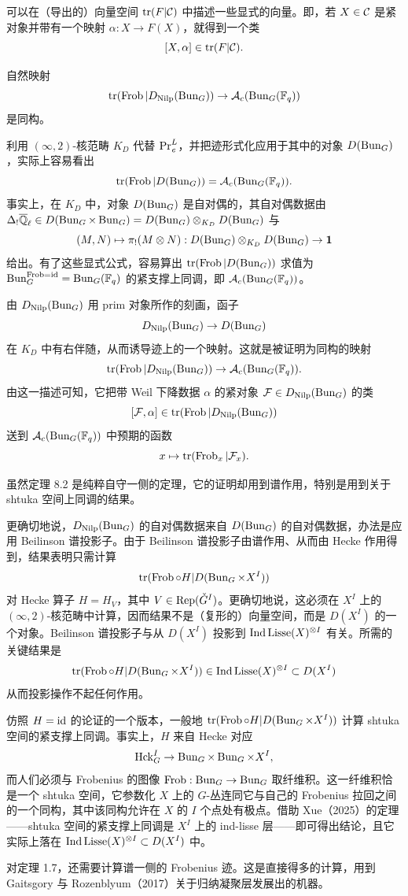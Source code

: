 可以在（导出的）向量空间 $\tr(F|\cC)$ 中描述一些显式的向量。即，若 $X\in\cC$ 是紧对象并带有一个映射 $\alpha:X\to F(X)$，就得到一个类
\[ [X,\alpha]\in\tr(F|\cC). \]

\begin{theorem}
自然映射
\[ \tr(\Frob|D_{\Nilp}(\Bun_G))\to\cA_c(\Bun_G(\Fq)) \]
是同构。
\end{theorem}

利用 $(\infty,2)$-核范畴 $K_D$ 代替 $\PrL_{\e}$，并把迹形式化应用于其中的对象 $D(\Bun_G)$，实际上容易看出
\[ \tr(\Frob|D(\Bun_G))=\cA_c(\Bun_G(\Fq)). \]
事实上，在 $K_D$ 中，对象 $D(\Bun_G)$ 是自对偶的，其自对偶数据由 $\Delta_{!}\Ql\in D(\Bun_G\times\Bun_G)=D(\Bun_G)\otimes_{K_D}D(\Bun_G)$ 与
\[ (M,N)\mapsto\pi_{!}(M\otimes N):D(\Bun_G)\otimes_{K_D}D(\Bun_G)\to\mathbf{1} \]
给出。有了这些显式公式，容易算出 $\tr(\Frob|D(\Bun_G))$ 求值为 $\Bun_G^{\Frob=\id}=\Bun_G(\Fq)$ 的紧支撑上同调，即 $\cA_c(\Bun_G(\Fq))$。

由 $D_{\Nilp}(\Bun_G)$ 用 prim 对象所作的刻画，函子
\[ D_{\Nilp}(\Bun_G)\to D(\Bun_G) \]
在 $K_D$ 中有右伴随，从而诱导迹上的一个映射。这就是被证明为同构的映射
\[ \tr(\Frob|D_{\Nilp}(\Bun_G))\to\cA_c(\Bun_G(\Fq)). \]
由这一描述可知，它把带 Weil 下降数据 $\alpha$ 的紧对象 $\cF\in D_{\Nilp}(\Bun_G)$ 的类
\[ [\cF,\alpha]\in\tr(\Frob|D_{\Nilp}(\Bun_G)) \]
送到 $\cA_c(\Bun_G(\Fq))$ 中预期的函数
\[ x\mapsto\tr(\Frob_x|\cF_x). \]

虽然定理 8.2 是纯粹自守一侧的定理，它的证明却用到谱作用，特别是用到关于 shtuka 空间上同调的结果。

更确切地说，$D_{\Nilp}(\Bun_G)$ 的自对偶数据来自 $D(\Bun_G)$ 的自对偶数据，办法是应用 Beilinson 谱投影子。由于 Beilinson 谱投影子由谱作用、从而由 Hecke 作用得到，结果表明只需计算
\[ \tr(\Frob\circ H|D(\Bun_G\times X^{I})) \]
对 Hecke 算子 $H=H_V$，其中 $V\in\Rep(\Gd^{I})$。更确切地说，这必须在 $X^{I}$ 上的 $(\infty,2)$-核范畴中计算，因而结果不是（复形的）向量空间，而是 $D(X^{I})$ 的一个对象。Beilinson 谱投影子与从 $D(X^{I})$ 投影到 $\Ind\Lisse(X)^{\otimes I}$ 有关。所需的关键结果是
\[ \tr(\Frob\circ H|D(\Bun_G\times X^{I}))\in\Ind\Lisse(X)^{\otimes I}\subset D(X^{I}) \]
从而投影操作不起任何作用。

仿照 $H=\id$ 的论证的一个版本，一般地 $\tr(\Frob\circ H|D(\Bun_G\times X^{I}))$ 计算 shtuka 空间的紧支撑上同调。事实上，$H$ 来自 Hecke 对应
\[ \Hck^{I}_{G}\to\Bun_G\times\Bun_G\times X^{I}, \]
而人们必须与 Frobenius 的图像 $\Frob:\Bun_G\to\Bun_G$ 取纤维积。这一纤维积恰是一个 shtuka 空间，它参数化 $X$ 上的 $G$-丛连同它与自己的 Frobenius 拉回之间的一个同构，其中该同构允许在 $X$ 的 $I$ 个点处有极点。借助 Xue（2025）的定理——shtuka 空间的紧支撑上同调是 $X^{I}$ 上的 ind-lisse 层——即可得出结论，且它实际上落在 $\Ind\Lisse(X)^{\otimes I}\subset D(X^{I})$ 中。

\begin{remark}
对定理 1.7，还需要计算谱一侧的 Frobenius 迹。这是直接得多的计算，用到 Gaitsgory 与 Rozenblyum（2017）关于归纳凝聚层发展出的机器。
\end{remark}
